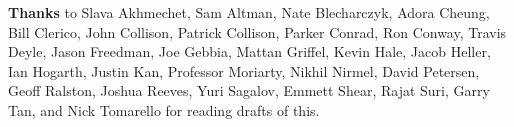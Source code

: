 \textbf{Thanks}
                  to Slava Akhmechet, Sam Altman, Nate Blecharczyk, Adora
                  Cheung, Bill Clerico, John Collison, Patrick Collison, Parker
                  Conrad, Ron Conway, Travis Deyle, Jason Freedman, Joe Gebbia,
                  Mattan Griffel, Kevin Hale, Jacob Heller, Ian Hogarth, Justin
                  Kan, Professor Moriarty, Nikhil Nirmel, David Petersen, Geoff
                  Ralston, Joshua Reeves, Yuri Sagalov, Emmett Shear, Rajat
                  Suri, Garry Tan, and Nick Tomarello for reading drafts of
                  this.


              
            
          
